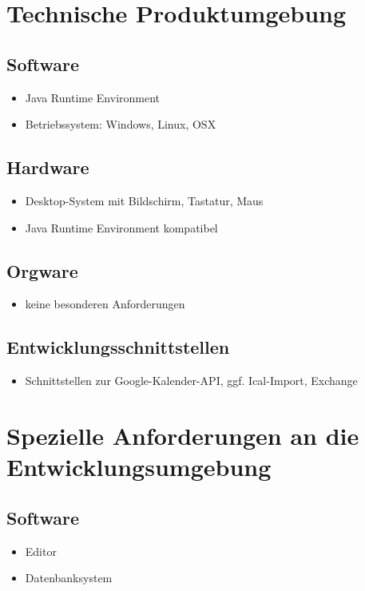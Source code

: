 \documentclass[a4paper]{article}
\begin{document}
  \section{Technische Produktumgebung}
    \subsection{Software}
	    \begin{itemize}
	    	\item Java Runtime Environment
				\item Betriebssystem: Windows, Linux, OSX
	    \end{itemize}
    \subsection{Hardware}
	    \begin{itemize}
	    	\item Desktop-System mit Bildschirm, Tastatur, Maus
				\item Java Runtime Environment kompatibel
	    \end{itemize}
    \subsection{Orgware}
	    \begin{itemize}
	    	\item keine besonderen Anforderungen
	    \end{itemize}
    \subsection{Entwicklungsschnittstellen}
	    \begin{itemize}
	    	\item Schnittstellen zur Google-Kalender-API, ggf. Ical-Import, Exchange
	    \end{itemize}

  \section{Spezielle Anforderungen an die Entwicklungsumgebung}
    \subsection{Software}
	      \begin{itemize}
	      	\item Editor
					\item Datenbanksystem
	      \end{itemize}
\end{document}
